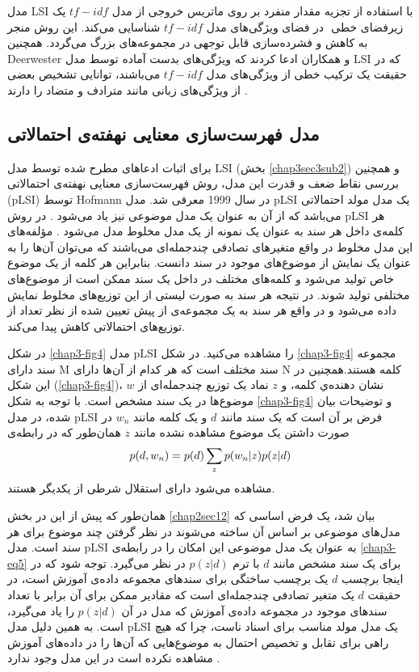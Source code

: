 	مدل
	LSI
	با استفاده از تجزیه مقدار منفرد
	 بر روی ماتریس خروجی از مدل
	$tf-idf$
	یک زیرفضای خطی
	‌ در فضای ویژگی‌‌های مدل
	$tf-idf$
	شناسایی می‌‌کند. این روش منجر به کاهش و فشرده‌سازی قابل توجهی‌ در مجموعه‌های بزرگ می‌‌گردد. همچنین
	Deerwester
	و همکاران ادعا کردند که ویژگی‌‌های بدست آماده توسط مدل
	LSI
	که در حقیقت یک ترکیب خطی‌ از ویژگی‌‌های مدل
	$tf-idf$
	می‌باشند، توانایی تشخیص بعضی‌ از ویژگی‌‌های زبانی مانند مترادف و متضاد را دارند
	\cite{deerwester1990indexing}.
	
	\subsection{مدل فهرست‌سازی معنایی نهفته‌ی احتمالاتی}
	\label{chap3sec3sub3}
	برای اثبات ادعا‌های مطرح شده توسط مدل
	LSI (بخش \ref{chap3sec3sub2})
	و همچنین بررسی‌ نقاط ضعف و قدرت این مدل، روش فهرست‌سازی معنایی نهفته‌ی احتمالاتی (pLSI)
	 توسط 
	Hofmann \cite{hofmann1999probabilistic}
در سال 1999 معرفی شد. مدل 
	pLSI
	یک مدل مولد احتمالاتی می‌باشد که از آن به عنوان یک مدل موضوعی نیز یاد می‌شود
	\cite{blei2003latent}.
	 در روش 
	 pLSI
	 هر کلمه‌ی داخل هر سند به عنوان یک نمونه از یک مدل مخلوط مدل می‌شود
	 \cite{hofmann1999probabilistic}.
	  مؤلفه‌های این مدل مخلوط در واقع متغیرهای تصادفی چندجمله‌ای می‌باشند که می‌توان آن‌ها را به عنوان یک نمایش از موضوع‌های موجود در سند دانست. بنابراین هر کلمه از یک موضوع خاص تولید می‌‌شود و کلمه‌های مختلف در داخل یک سند ممکن است از موضوع‌های مختلفی‌ تولید شوند. در نتیجه هر سند به صورت لیستی از این توزیع‌های مخلوط نمایش داده می‌‌شود و در واقع هر سند به یک مجموعه‌ی از پیش تعیین شده از نظر تعداد از توزیع‌های احتمالاتی کاهش پیدا می‌کند.
	
	در شکل
	\ref{chap3-fig4}
	مدل
	pLSI
	را مشاهده می‌کنید‌. در شکل
	\ref{chap3-fig4}
	 مجموعه سند دارای
	M
	سند مختلف است که هر کدام از آن‌ها دارای
	N
	کلمه‌ هستند.همچنین در این شکل
	(\ref{chap3-fig4})، $w$
	نشان دهنده‌ي کلمه، و
	$z$
	نماد یک توزیع چندجمله‌ای از موضوع‌ها در یک سند مشخص است. با توجه به شکل
	\ref{chap3-fig4}
	و توضیحات بیان شده، در مدل
	pLSI
	فرض بر آن است که یک سند مانند
	$d$
	و یک کلمه‌ مانند
	$w_n$
	در صورت داشتن یک موضوع مشاهده نشده مانند
	$z$
	همان‌طور که در رابطه‌ی
	\begin{align}
		\centering
		\label{chap3-eq5}
		p(d,w_n) = p(d) \sum_{z} p(w_n|z)p(z|d)
	\end{align}
	مشاهده می‌‌شود دارای استقلال شرطی از یکدیگر هستند.

	همان‌طور که پیش از این در بخش
	\ref{chap2sec12}
	بیان شد، یک فرض اساسی‌ که مدل‌های موضوعی بر اساس آن ساخته می‌‌شوند در نظر گرفتن چند موضوع برای هر سند است. مدل
	pLSI
	به عنوان یک مدل موضوعی این امکان را در رابطه‌ی
	\ref{chap3-eq5}
	برای یک سند مشخص مانند
	$d$
	با ترم
	$p(z|d)$
	در نظر می‌‌گیرد. توجه شود که در اینجا برچسب
	$d$
	یک برچسب ساختگی برای سند‌های مجموعه داده‌ی آموزش است، در حقیقت
	$d$
	یک متغیر تصادفی چندجمله‌ای است که مقادیر ممکن برای آن برابر با تعداد سند‌های موجود در مجموعه داده‌ی آموزش که مدل در آن
	$p(z|d)$
	را یاد می‌‌گیرد، است. به همین دلیل مدل
	pLSI
	یک مدل مولد مناسب برای اسناد‌ ناست، چرا که هیچ راهی‌ برای تقابل و تخصیص احتمال به موضوع‌هایی که آن‌ها را در داده‌های آموزش مشاهده 
	نکرده است در این مدل وجود ندارد
	\cite{blei2003latent}.
	
